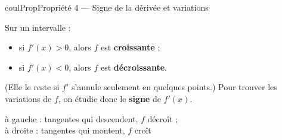 \documentclass[11pt,a4paper]{article}
\makeatletter
\newcommand{\lycee@repere}[4]{%
  \draw[grille,step=1] (#1,#2) grid (#3,#4);
  \draw[-{Stealth[length=2mm]},thick] (#1,0)--({#3+0.4},0) node[below left=-1pt]{$x$};
  \draw[-{Stealth[length=2mm]},thick] (0,#2)--(0,{#4+0.4}) node[below left=-1pt]{$y$};
  \node[below left,font=\scriptsize,inner sep=1.5pt] at (0,0) {$0$};}
\newcommand{\lycee@gradx}[1]{\foreach \k/\l in {#1}{%
  \draw (\k,0.07)--(\k,-0.07) node[below,font=\scriptsize,inner sep=1.5pt]{$\l$};}}
\newcommand{\lycee@grady}[1]{\foreach \k/\l in {#1}{%
  \draw (0.07,\k)--(-0.07,\k) node[left,font=\scriptsize,inner sep=1.5pt]{$\l$};}}
\providecommand{\repere}{\lycee@repere}%
\providecommand{\gradx}{\lycee@gradx}%
\providecommand{\grady}{\lycee@grady}%
\newcounter{lycee@signet}
\newcommand{\signet}[3][]{\stepcounter{lycee@signet}%
  \edef\lycee@dest{\if\relax\detokenize{#1}\relax
    signet.\arabic{lycee@signet}\else#1\fi}%
  \hypertarget{\lycee@dest}{}\bookmark[level=#2,dest=\lycee@dest]{#3}}
\newenvironment{proprietebox}[1][Propriété]%
  {\begin{boitecours}[phantom={\signet{2}{#1}}]{coulProp}{#1}}{\end{boitecours}}
\makeatother
\begin{document}
\begin{proprietebox}[Propriété 4 --- Signe de la dérivée et variations]
\begin{minipage}[c]{0.6\linewidth}\raggedright
Sur un intervalle :
\begin{itemize}
  \item si $f'(x)>0$, alors $f$ est \textbf{croissante} ;
  \item si $f'(x)<0$, alors $f$ est \textbf{décroissante}.
\end{itemize}
(Elle le reste si $f'$ s'annule seulement en quelques points.)
Pour trouver les variations de $f$, on étudie donc le \textbf{signe} de $f'(x)$.
\end{minipage}\hfill
\begin{minipage}[c]{0.36\linewidth}\centering
{}\par
{\footnotesize à gauche : tangentes qui descendent, $f$ décroît ;\\
à droite : tangentes qui montent, $f$ croît}
\end{minipage}
\end{proprietebox}
\end{document}
